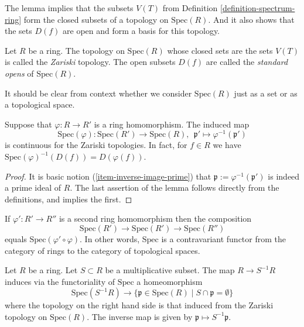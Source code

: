 \noindent
The lemma implies that the subsets $V(T)$ from
Definition \ref{definition-spectrum-ring} form the closed
subsets of a topology on $\text{Spec}(R)$. And it also shows that
the sets $D(f)$ are open and form a basis for this
topology.

\begin{definition}
\label{definition-Zariski-topology}
Let $R$ be a ring.
The topology on $\text{Spec}(R)$ whose closed sets are the
sets $V(T)$ is called the {\it Zariski} topology. The open
subsets $D(f)$ are called the {\it standard opens} of $\text{Spec}(R)$.
\end{definition}

\noindent
It should be clear from context whether we consider $\text{Spec}(R)$
just as a set or as a topological space.

\begin{lemma}
\label{lemma-spec-functorial}
Suppose that $\varphi : R \to R'$ is a ring homomorphism.
The induced map
$$
\text{Spec}(\varphi) :
\text{Spec}(R')
\longrightarrow
\text{Spec}(R), \ \ 
\mathfrak p'
\longmapsto
\varphi^{-1}(\mathfrak p')
$$
is continuous for the Zariski topologies. In fact, for
$f \in R$ we have
$\text{Spec}(\varphi)^{-1}(D(f)) = D(\varphi(f))$.
\end{lemma}

\begin{proof}
It is basic notion (\ref{item-inverse-image-prime}) that
$\mathfrak p := \varphi^{-1}(\mathfrak p')$
is indeed a prime ideal of $R$. The last assertion
of the lemma follows directly from the definitions,
and implies the first.
\end{proof}

\noindent
If $\varphi' : R' \to R''$ is a second ring homomorphism
then the composition
$$
\text{Spec}(R')
\longrightarrow
\text{Spec}(R')
\longrightarrow
\text{Spec}(R'')
$$
equals $\text{Spec}(\varphi' \circ \varphi)$. In other
words, $\text{Spec}$ is a contravariant functor from the
category of rings to the category of topological spaces.

\begin{lemma}
\label{lemma-spec-localization}
Let $R$ be a ring. Let $S \subset R$ be a multiplicative subset.
The map $R \to S^{-1}R$ induces via the functoriality of $\text{Spec}$
a homeomorphism
$$
\text{Spec}(S^{-1}R)
\longrightarrow
\{\mathfrak p \in \text{Spec}(R) \mid S \cap \mathfrak p = \emptyset \}
$$
where the topology on the right hand side is that induced from the
Zariski topology on $\text{Spec}(R)$. The inverse map is given
by $\mathfrak p \mapsto S^{-1}\mathfrak p$.
\end{lemma}

